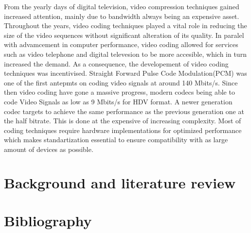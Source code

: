 \documentclass[a4paper,11pt,oneside]{article}
\begin{document}
  



  \indent From the yearly days of digital television, video compression techniques gained increased attention, mainly due to bandwidth always being 
  an expensive asset. Throughout the years, video coding techniques played a vital role in reducing the size of the video sequences without significant
  alteration of its quality. In paralel with advamcement in computer performance, video coding allowed for services such as video telephone and digital 
  televesion to be more accesible, which in turn increased the demand. As a consequence, the developement of video coding techniques was incentivised. 
  Straight Forward Pulse Code Modulation(PCM) was one of the first antepmts on coding video signals at around 140 Mbits/s. Since then video coding 
  have gone a massive progress, modern codecs being able to code Video Signals as low as 9 Mbits/s for HDV format. A newer generation codec targets 
  to achieve the same performance as the previous generation one at the half bitrate. This is done at the expensive of increasing complexity. Most of coding
  techniques require hardware implementations for optimized performance which makes standartization essential to ensure compatibility with as large amount of devices 
  as possible.\cite{ghanbari2011standard}

  \newpage
  \section{Background and literature review}
  






  
  
  


  \newpage
  \section*{Bibliography}
  \printbibliography
\end{document}
